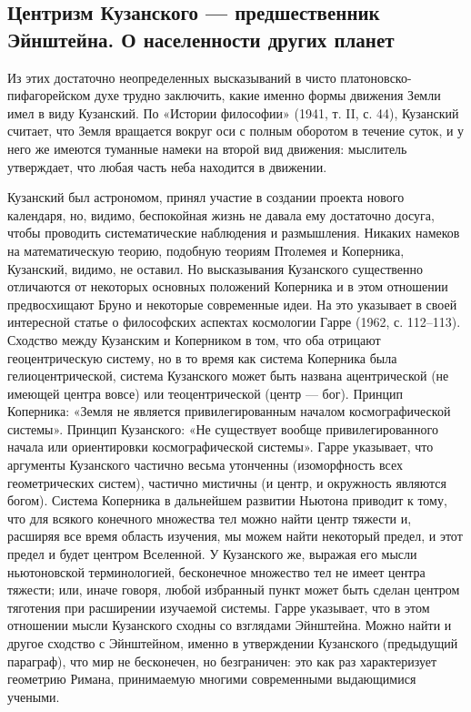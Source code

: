 \subsection{Центризм  Кузанского   ---  предшественник   Эйнштейна.  О
населенности других планет}

Из    этих   достаточно    неопределенных    высказываний   в    чисто
платоновско-пифагорейском  духе трудно  заключить, какие  именно формы
движения Земли имел в виду Кузанский. По «Истории философии» (1941, т.
II, с. 44), Кузанский считает, что Земля вращается вокруг оси с полным
оборотом  в течение  суток, и  у него  же имеются  туманные намеки  на
второй  вид  движения:  мыслитель  утверждает, что  любая  часть  неба
находится в движении.

Кузанский  был астрономом,  принял участие  в создании  проекта нового
календаря,  но, видимо,  беспокойная  жизнь не  давала ему  достаточно
досуга,  чтобы  проводить  систематические наблюдения  и  размышления.
Никаких намеков на математическую  теорию, подобную теориям Птолемея и
Коперника, Кузанский,  видимо, не оставил. Но  высказывания Кузанского
существенно отличаются  от некоторых основных положений  Коперника и в
этом отношении  предвосхищают Бруно  и некоторые современные  идеи. На
это  указывает  в  своей  интересной  статье  о  философских  аспектах
космологии  Гарре  (1962, с.  112--113).  Сходство  между Кузанским  и
Коперником  в  том,  что  оба  отрицают  геоцентрическую  систему,  но
в  то  время как  система  Коперника  была гелиоцентрической,  система
Кузанского может быть названа  ацентрической (не имеющей центра вовсе)
или  теоцентрической (центр  ---  бог). Принцип  Коперника: «Земля  не
является привилегированным началом  космографической системы». Принцип
Кузанского:  «Не  существует   вообще  привилегированного  начала  или
ориентировки космографической системы». Гарре указывает, что аргументы
Кузанского частично весьма утонченны (изоморфность всех геометрических
систем),  частично мистичны  (и центр,  и окружность  являются богом).
Система Коперника в  дальнейшем развитии Ньютона приводит  к тому, что
для  всякого конечного  множества  тел можно  найти  центр тяжести  и,
расширяя все время область изучения,  мы можем найти некоторый предел,
и этот предел и будет центром  Вселенной. У Кузанского же, выражая его
мысли ньютоновской  терминологией, бесконечное множество тел  не имеет
центра тяжести;  или, иначе говоря,  любой избранный пункт  может быть
сделан  центром  тяготения  при расширении  изучаемой  системы.  Гарре
указывает, что в  этом отношении мысли Кузанского  сходны со взглядами
Эйнштейна.  Можно  найти и  другое  сходство  с Эйнштейном,  именно  в
утверждении Кузанского  (предыдущий параграф), что мир  не бесконечен,
но   безграничен:  это   как  раз   характеризует  геометрию   Римана,
принимаемую многими современными выдающимися учеными.

